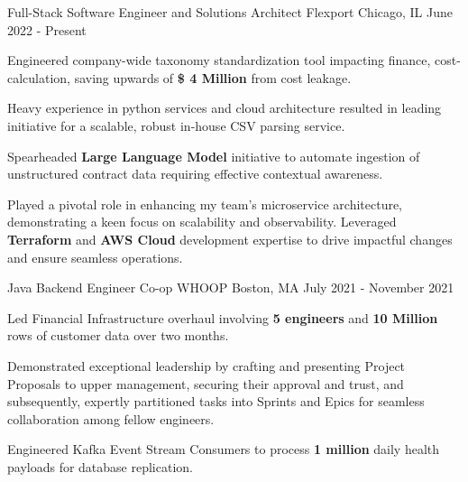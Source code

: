 

\begin{cventries}

\cventry
    {Full-Stack Software Engineer and Solutions Architect} %
    {Flexport} %
    {Chicago, IL} %
    {June 2022 - Present} %
    {
      \begin{cvitems} %
        \item {Engineered company-wide taxonomy standardization tool impacting finance, cost-calculation, saving upwards of \textbf{\$ 4 Million} from cost leakage.}
        \item {Heavy experience in python services and cloud architecture resulted in leading initiative for a scalable, robust in-house CSV parsing service.}
        \item{Spearheaded \textbf{Large Language Model} initiative to automate ingestion of unstructured contract data requiring effective contextual awareness.}
        \item{Played a pivotal role in enhancing my team's microservice architecture, demonstrating a keen focus on scalability and observability. Leveraged \textbf{Terraform} and \textbf{AWS Cloud} development expertise to drive impactful changes and ensure seamless operations.}
      \end{cvitems}
    }

  \cventry
    {Java Backend Engineer Co-op} %
    {WHOOP} %
    {Boston, MA} %
    {July 2021 - November 2021} %
    {
      \begin{cvitems} %
        \item {Led Financial Infrastructure overhaul involving \textbf{5 engineers} and \textbf{10 Million} rows of customer data over two months.}
        \item {Demonstrated exceptional leadership by crafting and presenting Project Proposals to upper management, securing their approval and trust, and subsequently, expertly partitioned tasks into Sprints and Epics for seamless collaboration among fellow engineers.}
        \item {Engineered Kafka Event Stream Consumers to process \textbf{1 million} daily health payloads for database replication.}
      \end{cvitems}
    }
    

\end{cventries}
